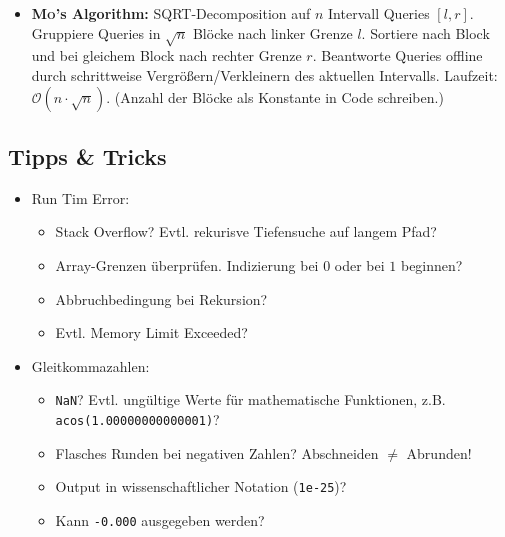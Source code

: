 \begin{itemize}
	\item \textbf{\textsc{Mo}'s Algorithm:}
	SQRT-Decomposition auf $n$ Intervall Queries $[l,r]$.
	Gruppiere Queries in $\sqrt{n}$ Blöcke nach linker Grenze $l$.
	Sortiere nach Block und bei gleichem Block nach rechter Grenze $r$.
	Beantworte Queries offline durch schrittweise Vergrößern/Verkleinern des aktuellen Intervalls.
	Laufzeit:~$\mathcal{O}(n\cdot\sqrt{n})$.
	(Anzahl der Blöcke als Konstante in Code schreiben.)
\end{itemize}

\subsection{Tipps \& Tricks}

\begin{itemize}
	\item Run Tim Error:
	\begin{itemize}
		\item Stack Overflow? Evtl. rekurisve Tiefensuche auf langem Pfad?
		\item Array-Grenzen überprüfen. Indizierung bei $0$ oder bei $1$ beginnen?
		\item Abbruchbedingung bei Rekursion?
		\item Evtl. Memory Limit Exceeded?
	\end{itemize}

	\item Gleitkommazahlen:
	\begin{itemize}
		\item \lstinline{NaN}? Evtl. ungültige Werte für mathematische Funktionen, z.B. \lstinline{acos(1.00000000000001)}?
		\item Flasches Runden bei negativen Zahlen? Abschneiden $\neq$ Abrunden!
		\item Output in wissenschaftlicher Notation (\lstinline{1e-25})?
		\item Kann \lstinline{-0.000} ausgegeben werden?
	\end{itemize}


\end{itemize}

